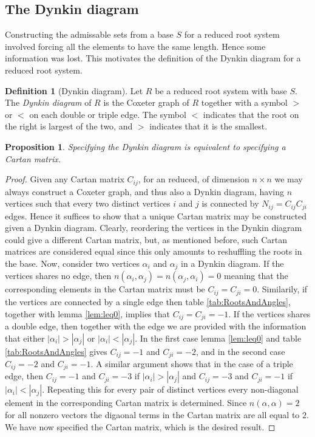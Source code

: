 \documentclass[twoside,utf8]{article}
\theoremstyle{plain}
\newtheorem{proposition}{Proposition}
\theoremstyle{definition}
\newtheorem{definition}{Definition}
\theoremstyle{remark}
\begin{document}
\subsection{The Dynkin diagram}
Constructing the admissable sets from a base $S$ for a reduced root system involved forcing all the elements to have the same length. Hence some information was lost. This motivates the definition of the Dynkin diagram for a reduced root system.


\begin{definition}[Dynkin diagram]
Let $R$ be a reduced root system with base $S$. The \textit{Dynkin diagram} of $R$ is the Coxeter graph of $R$ together with a symbol $>$ or $<$ on each double or triple edge. The symbol $<$ indicates that the root on the right is largest of the two, and $>$ indicates that it is the smallest. 
\end{definition}

\begin{proposition}\label{prop:DynkinEquivToCartan}
Specifying the Dynkin diagram is equivalent to specifying a Cartan matrix. 
\end{proposition}
\begin{proof}
Given any Cartan matrix $C_{ij}$, for an reduced, of dimension $n\times n$ we may always construct a Coxeter graph, and thus also a Dynkin diagram, having $n$ vertices such that every two distinct vertices $i$ and $j$ is connected by $N_{ij}=C_{ij}C_{ji}$ edges. Hence it suffices to show that a unique Cartan matrix may be constructed given a Dynkin diagram. Clearly, reordering the vertices in the Dynkin diagram could give a different Cartan matrix, but, as mentioned before, such Cartan matrices are considered equal since this only amounts to reshuffling the roots in the base. Now, consider two vertices $\alpha_i$ and $\alpha_j$ in a Dynkin diagram. If the vertices shares no edge, then $n(\alpha_i,\alpha_j)=n(\alpha_j,\alpha_i)=0$ meaning that the corresponding elements in the Cartan matrix must be $C_{ij}=C_{ji}=0$. Similarily, if the vertices are connected by a single edge then table \ref*{tab:RootsAndAngles}, together with lemma \ref*{lem:leq0}, implies that $C_{ij}=C_{ji}=-1$. If the vertices shares a double edge, then together with the edge we are provided with the information that either $|\alpha_i|>|\alpha_j|$ or $|\alpha_i|<|\alpha_j|$. In the first case lemma \ref*{lem:leq0} and table \ref*{tab:RootsAndAngles} gives $C_{ij}=-1$ and $C_{ji}=-2$, and in the second case $C_{ij}=-2$ and $C_{ji}=-1$. A similar argument shows that in the case of a triple edge, then $C_{ij}=-1$ and $C_{ji}=-3$ if $|\alpha_i|>|\alpha_j|$ and $C_{ij}=-3$ and $C_{ji}=-1$ if $|\alpha_i|<|\alpha_j|$. Repeating this for every pair of distinct vertices every non-diagonal element in the corresponding Cartan matrix is determined. Since $n(\alpha,\alpha)=2$ for all nonzero vectors the digaonal terms in the Cartan matrix are all equal to $2$. We have now specified the Cartan matrix, which is the desired result.
\end{proof}
\end{document}
